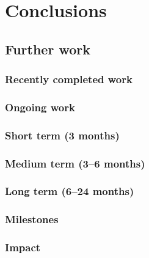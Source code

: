 \chapter{Conclusions}
\label{chp:conclusions}

\lipsum[1]
    

\section{Further work}

\lipsum[1]
    
    \subsection{Recently completed work}

    \lipsum[1]
    
    \subsection{Ongoing work}
    
   
    \subsection{Short term (3 months)}

    \subsection{Medium term (3--6 months)}
    

    \subsection{Long term (6--24 months)}
    

    \subsection{Milestones}
    
    
    \subsection{Impact}
    
    
\clearpage